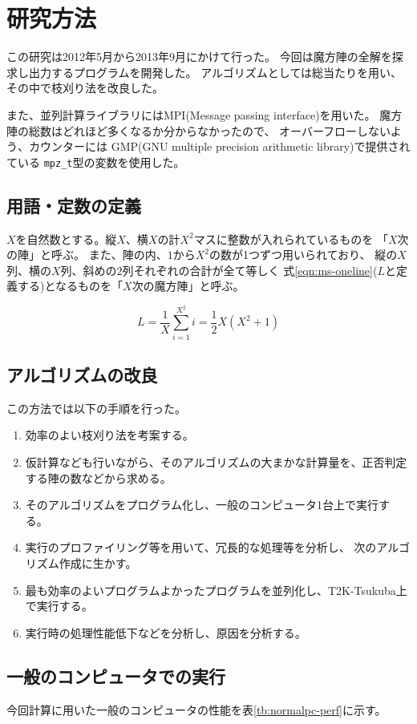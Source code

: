 \section{研究方法}
この研究は2012年5月から2013年9月にかけて行った。
今回は魔方陣の全解を探求し出力するプログラムを開発した。
アルゴリズムとしては総当たりを用い、その中で枝刈り法を改良した。

また、並列計算ライブラリにはMPI(Message passing interface)を用いた。
魔方陣の総数はどれほど多くなるか分からなかったので、
オーバーフローしないよう、カウンターには
GMP(GNU multiple precision arithmetic library)で提供されている
{\tt mpz\_t}型の変数を使用した。

\subsection{用語・定数の定義}
$X$を自然数とする。縦$X$、横$X$の計$X^2$マスに整数が入れられているものを
「$X$次の陣」と呼ぶ。
また、陣の内、$1$から$X^2$の数が1つずつ用いられており、
縦の$X$列、横の$X$列、斜めの$2$列それぞれの合計が全て等しく
式\ref{eqn:ms-oneline}($L$と定義する)となるものを「$X$次の魔方陣」と呼ぶ。

\begin{equation} \label{eqn:ms-oneline}
L=\frac{1}{X} \sum_{i=1}^{X^2}i = \frac{1}{2} X(X^2+1)
\end{equation}


\subsection{アルゴリズムの改良}
この方法では以下の手順を行った。
\begin{enumerate}
	\item 効率のよい枝刈り法を考案する。
	\item 仮計算なども行いながら、そのアルゴリズムの大まかな計算量を、正否判定する陣の数などから求める。
	\item そのアルゴリズムをプログラム化し、一般のコンピュータ1台上で実行する。
	\item 実行のプロファイリング等を用いて、冗長的な処理等を分析し、
	 	次のアルゴリズム作成に生かす。
	\item 最も効率のよいプログラムよかったプログラムを並列化し、T2K-Tsukuba上で実行する。
	\item 実行時の処理性能低下などを分析し、原因を分析する。
\end{enumerate}


\subsection{一般のコンピュータでの実行}
今回計算に用いた一般のコンピュータの性能を表\ref{tb:normalpc-perf}に示す。

